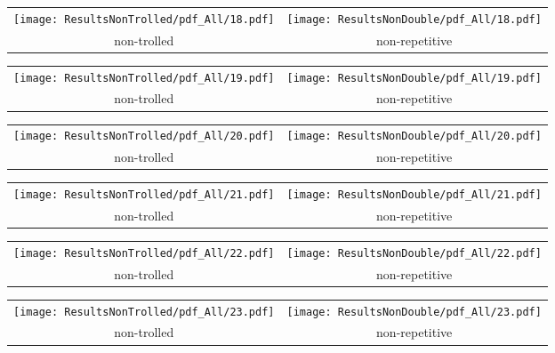 \begin{tabular}{cc}
{  \texttt{[image: ResultsNonTrolled/pdf\_All/18.pdf]} } & 
{  \texttt{[image: ResultsNonDouble/pdf\_All/18.pdf]}} \\
 non-trolled & non-repetitive \\
\end{tabular}

\begin{tabular}{cc}
{  \texttt{[image: ResultsNonTrolled/pdf\_All/19.pdf]} } & 
{  \texttt{[image: ResultsNonDouble/pdf\_All/19.pdf]}} \\
 non-trolled & non-repetitive \\
\end{tabular}

\begin{tabular}{cc}
{  \texttt{[image: ResultsNonTrolled/pdf\_All/20.pdf]} } & 
{  \texttt{[image: ResultsNonDouble/pdf\_All/20.pdf]}} \\
 non-trolled & non-repetitive \\
\end{tabular}

\begin{tabular}{cc}
{  \texttt{[image: ResultsNonTrolled/pdf\_All/21.pdf]} } & 
{  \texttt{[image: ResultsNonDouble/pdf\_All/21.pdf]}} \\
 non-trolled & non-repetitive \\
\end{tabular}

\begin{tabular}{cc}
{  \texttt{[image: ResultsNonTrolled/pdf\_All/22.pdf]} } & 
{  \texttt{[image: ResultsNonDouble/pdf\_All/22.pdf]}} \\
 non-trolled & non-repetitive \\
\end{tabular}

\begin{tabular}{cc}
{  \texttt{[image: ResultsNonTrolled/pdf\_All/23.pdf]} } & 
{  \texttt{[image: ResultsNonDouble/pdf\_All/23.pdf]}} \\
 non-trolled & non-repetitive \\
\end{tabular}

